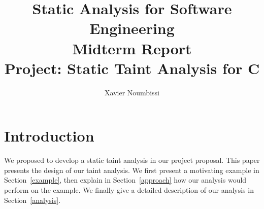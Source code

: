 \documentclass[10pt]{article}
\title{Static Analysis for Software Engineering\\
		Midterm Report \\
		Project: Static Taint Analysis for C}
\author{Xavier Noumbissi}
\date{}
\begin{document}
\maketitle

\section{Introduction}

We proposed to develop a static taint analysis in our
project proposal.
This paper presents the design of our taint analysis.
We first present a motivating example in Section~\ref{example},
then explain in Section~\ref{approach} how our analysis
would perform on the example. We finally give a detailed
description of our analysis in Section~\ref{analysis}.







\end{document}
